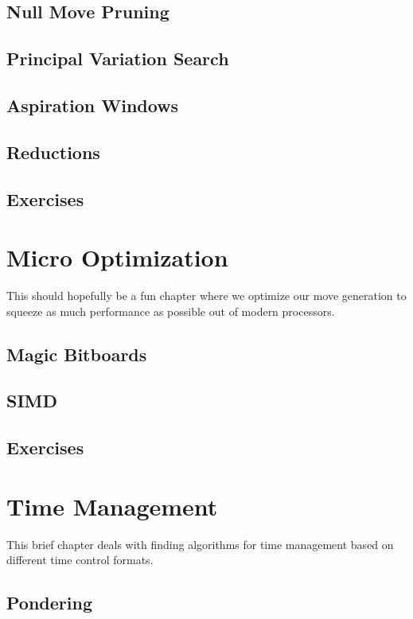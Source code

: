\documentclass[letterpaper,11pt]{article}
\begin{document}
\subsection{Null Move Pruning}
\subsection{Principal Variation Search}
\subsection{Aspiration Windows}
\subsection{Reductions}
\subsection{Exercises}

\section{Micro Optimization}

This should hopefully be a fun chapter where we optimize our move generation to squeeze as much performance 
as possible out of modern processors.

\subsection{Magic Bitboards}
\subsection{SIMD}
\subsection{Exercises}

\section{Time Management}

This brief chapter deals with finding algorithms for time management based on different time control formats.

\subsection{Pondering}
\end{document}
